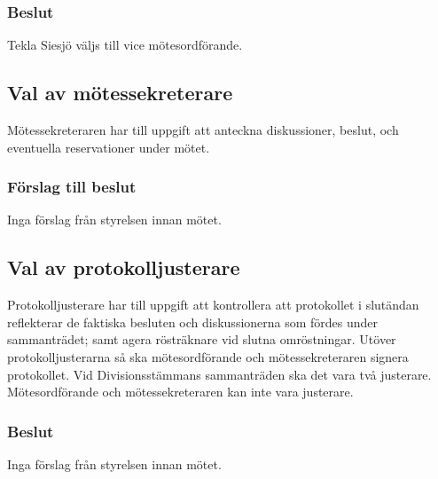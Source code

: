 \documentclass[protokoll]{dvd}
\begin{document}
\subsubsection*{Beslut}

\begin{attsatser}
    \item Tekla Siesjö väljs till vice mötesordförande.
\end{attsatser}

\subsection{Val av mötessekreterare}

Mötessekreteraren har till uppgift att anteckna diskussioner, beslut, och eventuella reservationer under mötet.

\subsubsection*{Förslag till beslut}

\begin{attsatser}
    \item Inga förslag från styrelsen innan mötet.
\end{attsatser}

\subsection{Val av protokolljusterare}

Protokolljusterare har till uppgift att kontrollera att protokollet i slutändan reflekterar de faktiska besluten och diskussionerna som fördes under sammanträdet; samt agera rösträknare vid slutna omröstningar.
Utöver protokolljusterarna så ska mötesordförande och mötessekreteraren signera protokollet.
Vid Divisionsstämmans sammanträden ska det vara två justerare.
Mötesordförande och mötessekreteraren kan inte vara justerare.

\subsubsection*{Beslut}

\begin{attsatser}
    \item Inga förslag från styrelsen innan mötet.
\end{attsatser}

\newpage
\end{document}
